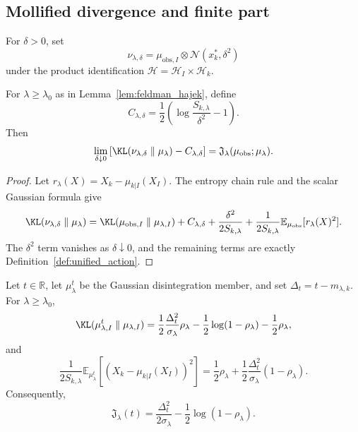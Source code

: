 \subsection{Mollified divergence and finite part}

For $\delta>0$, set
\[
  \nu_{\lambda,\delta}
  =
  \mu_{\mathrm{obs},I}\otimes\mathcal{N}(x_k^*,\delta^2)
\]
under the product identification
$\mathcal{H}=\mathcal{H}_I\times\mathcal{H}_k$.

\begin{proposition}
\label{prop:mollification_limit}
For $\lambda\ge\lambda_0$ as in Lemma~\ref{lem:feldman_hajek}, define
\[
  C_{\lambda,\delta}
  =
  \frac12\left(\log\frac{S_{k,\lambda}}{\delta^2}-1\right).
\]
Then
\[
  \lim_{\delta\downarrow0}
  \left[
    \KL(\nu_{\lambda,\delta}\parallel\mu_\lambda)
    -C_{\lambda,\delta}
  \right]
  =
  \mathfrak{J}_\lambda(\mu_{\mathrm{obs}};\mu_\lambda).
\]
\end{proposition}

\begin{proof}
Let $r_\lambda(X)=X_k-\mu_{k|I}(X_I)$.  The entropy chain rule and the scalar
Gaussian formula give
\[
  \KL(\nu_{\lambda,\delta}\parallel\mu_\lambda)
  =
  \KL(\mu_{\mathrm{obs},I}\parallel\mu_{\lambda,I})
  +C_{\lambda,\delta}
  +\frac{\delta^2}{2S_{k,\lambda}}
  +\frac{1}{2S_{k,\lambda}}
   \mathbb{E}_{\mu_{\mathrm{obs}}}[r_\lambda(X)^2].
\]
The $\delta^2$ term vanishes as $\delta\downarrow0$, and the remaining terms
are exactly Definition~\ref{def:unified_action}.
\end{proof}

\begin{lemma}
\label{lem:kl_finite_part_algebra}
Let $t\in\mathbb{R}$, let $\mu_\lambda^t$ be the Gaussian disintegration member,
and set $\Delta_t=t-m_{\lambda,k}$.  For $\lambda\ge\lambda_0$,
\begin{equation}
  \KL(\mu_{\lambda,I}^t\parallel\mu_{\lambda,I})
  =
  \frac12\frac{\Delta_t^2}{\sigma_\lambda}\rho_\lambda
  -\frac12\log(1-\rho_\lambda)-\frac12\rho_\lambda,
  \label{eq:bulk_KL_t_algebra}
\end{equation}
and
\begin{equation}
  \frac{1}{2S_{k,\lambda}}
  \mathbb{E}_{\mu_\lambda^t}
  \left[(X_k-\mu_{k|I}(X_I))^2\right]
  =
  \frac12\rho_\lambda
  +\frac12\frac{\Delta_t^2}{\sigma_\lambda}(1-\rho_\lambda).
  \label{eq:residual_t_algebra}
\end{equation}
Consequently,
\begin{equation}
  \mathfrak{J}_\lambda(t)
  =
  \frac{\Delta_t^2}{2\sigma_\lambda}
  -\frac12\log(1-\rho_\lambda).
  \label{eq:finite_part_exact_rank_one}
\end{equation}
\end{lemma}

